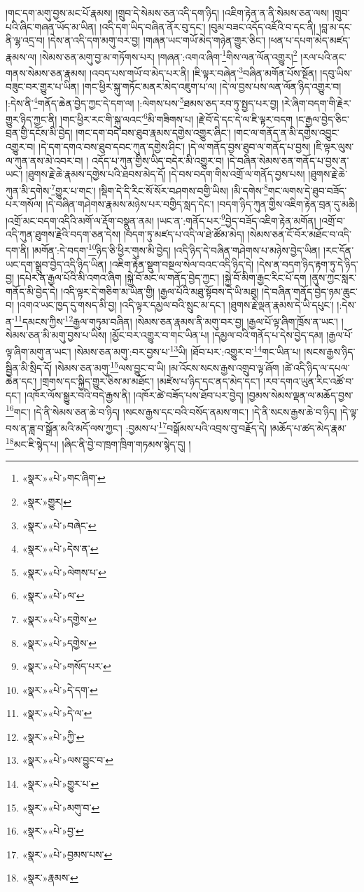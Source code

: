 །གང་དག་མགུ་བྱས་མང་པོ་རྣམས། །གྲུབ་དེ་སེམས་ཅན་འདི་དག་ཉིད། །འཇིག་རྟེན་ན་ནི་སེམས་ཅན་ལས། །གྲུབ་པའི་ཞིང་གཞན་ཡོད་མ་ཡིན། །འདི་དག་ཡིད་བཞིན་ནོར་བུ་དང་། །བུམ་བཟང་འདོད་འཇོའི་བ་དང་ནི། །བླ་མ་དང་ནི་ལྷ་འདྲ་བ། །དེས་ན་འདི་དག་མགུ་བར་བྱ། །གཞན་ཡང་གཡོ་མེད་གཉེན་གྱུར་ཅིང་། །ཕན་པ་དཔག་མེད་མཛད་རྣམས་ལ། །སེམས་ཅན་མགུ་བྱ་མ་གཏོགས་པར། །གཞན་:འགའ་ཞིག་\footnote{«སྣར་»«པེ་»གང་ཞིག་}གིས་ལན་ལོན་འགྱུར།\footnote{«སྣར་»གྱུར།} །རལ་པའི་ནང་གནས་སེམས་ཅན་རྣམས། །འབད་པས་གཡོ་བ་མེད་པར་ནི། །ཇི་ལྟར་བཞེན་\footnote{«སྣར་»«པེ་»བཞེང་}བཞིན་མགོན་པོས་སྔོན། །དབུ་ཡིས་བཟུང་བར་གྱུར་པ་ཡིན། །གང་ཕྱིར་སྐུ་གཏོང་མནར་མེད་འཇུག་པ་ལ། །དེ་ལ་བྱས་པས་ལན་ལོན་ཉིད་འགྱུར་བ། །:དེས་ནི་\footnote{«སྣར་»«པེ་»དེས་ན་}གནོད་ཆེན་བྱེད་ཀྱང་དེ་དག་ལ། །:ལེགས་པས་\footnote{«སྣར་»«པེ་»ལེགས་པ་}ཐམས་ཅད་རབ་ཏུ་སྤྱད་པར་བྱ། །རེ་ཞིག་བདག་གི་རྗེར་གྱུར་ཉིད་ཀྱང་ནི། །གང་ཕྱིར་རང་གི་སྐུ་ལའང་\footnote{«སྣར་»«པེ་»ལ་}མི་གཟིགས་པ། །རྗེ་བོ་དེ་དང་དེ་ལ་ཇི་ལྟར་བདག །ང་རྒྱལ་བྱེད་ཅིང་བྲན་གྱི་དངོས་མི་བྱེད། །གང་དག་བདེ་བས་ཐུབ་རྣམས་དགྱེས་འགྱུར་ཞིང་། །གང་ལ་གནོད་ན་མི་དགྱེས་འབྱུང་འགྱུར་བ། །དེ་དག་དགའ་བས་ཐུབ་དབང་ཀུན་དགྱེས་ཤིང་། །དེ་ལ་གནོད་བྱས་ཐུབ་ལ་གནོད་པ་བྱས། །ཇི་ལྟར་ལུས་ལ་ཀུན་ནས་མེ་འབར་བ། །
འདོད་པ་ཀུན་གྱིས་ཡིད་བདེར་མི་འགྱུར་བ། །དེ་བཞིན་སེམས་ཅན་གནོད་པ་བྱས་ན་ཡང་། །ཐུགས་རྗེ་ཆེ་རྣམས་དགྱེས་པའི་ཐབས་མེད་དོ། །དེ་བས་བདག་གིས་འགྲོ་ལ་གནོད་བྱས་པས། །ཐུགས་རྗེ་ཆེ་ཀུན་མི་དགེས་\footnote{«སྣར་»«པེ་»དགྱེས་}གྱུར་པ་གང་། །སྡིག་དེ་དི་རིང་སོ་སོར་བཤགས་བགྱི་ཡིས། །མི་དགེས་\footnote{«སྣར་»«པེ་»དགྱེས་}གང་ལགས་དེ་ཐུབ་བཟོད་པར་གསོལ། །དེ་བཞིན་གཤེགས་རྣམས་མཉེས་པར་བགྱིད་སླད་དེང་། །བདག་ཉིད་ཀུན་གྱིས་འཇིག་རྟེན་བྲན་དུ་མཆི། །འགྲོ་མང་བདག་འདིའི་མགོ་ལ་རྡོག་བསྣུན་ནམ། །ཡང་ན་:གནོད་པར་\footnote{«སྣར་»«པེ་»གསོད་པར་}བྱེད་བཟོད་འཇིག་རྟེན་མགོན། །འགྲོ་བ་འདི་ཀུན་ཐུགས་རྗེའི་བདག་ཅན་དེས། །བདག་ཏུ་མཛད་པ་འདི་ལ་ཐེ་ཚོམ་མེད། །སེམས་ཅན་ངོ་བོར་མཐོང་བ་འདི་དག་ནི། །མགོན་:དེ་བདག་\footnote{«སྣར་»«པེ་»དེ་དག་}ཉིད་ཅི་ཕྱིར་གུས་མི་བྱེད། །འདི་ཉིད་དེ་བཞིན་གཤེགས་པ་མཉེས་བྱེད་ཡིན། །རང་དོན་ཡང་དག་སྒྲུབ་བྱེད་འདི་ཉིད་ཡིན། །འཇིག་རྟེན་སྡུག་བསྔལ་སེལ་བའང་འདི་ཉིད་དེ། །དེས་ན་བདག་ཉིད་རྟག་ཏུ་དེ་ཉིད་བྱ། །དཔེར་ན་རྒྱལ་པོའི་མི་འགའ་ཞིག །སྐྱེ་བོ་མང་ལ་གནོད་བྱེད་ཀྱང་། །སྐྱེ་བོ་མིག་རྒྱང་རིང་པོ་དག །ནུས་ཀྱང་སླར་གནོད་མི་བྱེད་དེ། །འདི་ལྟར་དེ་གཅིག་མ་ཡིན་གྱི། །རྒྱལ་པོའི་མཐུ་སྟོབས་དེ་ཡི་མཐུ། །དེ་བཞིན་གནོད་བྱེད་ཉམ་ཆུང་བ། །འགའ་ཡང་ཁྱད་དུ་གསད་མི་བྱ། །འདི་ལྟར་དམྱལ་བའི་སྲུང་མ་དང་། །ཐུགས་རྗེ་ལྡན་རྣམས་དེ་ཡི་དཔུང་། །:དེས་ན་\footnote{«སྣར་»«པེ་»དེ་ལ་}དམངས་ཀྱིས་\footnote{«སྣར་»«པེ་»ཀྱི་}རྒྱལ་གཏུམ་བཞིན། །སེམས་ཅན་རྣམས་ནི་མགུ་བར་བྱ། །རྒྱལ་པོ་ལྟ་ཞིག་ཁྲོས་ན་ཡང་། །སེམས་ཅན་མི་མགུ་བྱས་པ་ཡིས། །མྱོང་བར་འགྱུར་བ་གང་ཡིན་པ། །དམྱལ་བའི་གནོད་པ་དེས་བྱེད་དམ། །རྒྱལ་པོ་ལྟ་ཞིག་མགུ་ན་ཡང་། །སེམས་ཅན་མགུ་:བར་བྱས་པ་\footnote{«སྣར་»«པེ་»ལས་བྱུང་བ་}ཡི། །ཐོབ་པར་:འགྱུར་བ་\footnote{«སྣར་»«པེ་»གྱུར་པ་}གང་ཡིན་པ། །སངས་རྒྱས་ཉིད་སྦྱིན་མི་སྲིད་དོ། །སེམས་ཅན་མགུ་\footnote{«སྣར་»«པེ་»མགུ་བ་}ལས་བྱུང་བ་ཡི། །མ་འོངས་སངས་རྒྱས་འགྲུབ་ལྟ་ཞོག །ཚེ་འདི་ཉིད་ལ་དཔལ་ཆེན་དང་། །གྲགས་དང་སྐྱིད་གྱུར་ཅིས་མ་མཐོང་། །མཛེས་པ་ཉིད་དང་ནད་མེད་དང་། །རབ་དགའ་ཡུན་རིང་འཚོ་བ་དང་། །འཁོར་ལོས་སྒྱུར་བའི་བདེ་རྒྱས་ནི། །འཁོར་ཚེ་བཟོད་པས་ཐོབ་པར་བྱེད། །བྱམས་སེམས་ལྡན་ལ་མཆོད་བྱས་\footnote{«སྣར་»«པེ་»བྱ་}གང་། །དེ་ནི་སེམས་ཅན་ཆེ་བ་ཉིད། །སངས་རྒྱས་དང་བའི་བསོད་ནམས་གང་། །དེ་ནི་སངས་རྒྱས་ཆེ་བ་ཉིད། །དེ་ལྟ་བས་ན་ཟླ་བ་སྒྲོན་མའི་མདོ་ལས་ཀྱང་། :བྱམས་པ་\footnote{«སྣར་»«པེ་»བྱམས་པས་}བསྒོམས་པའི་འབྲས་བུ་བརྗོད་དེ། །མཆོད་པ་ཚད་མེད་རྣམ་\footnote{«སྣར་»རྣམས་}མང་ཇི་སྙེད་པ། །ཞིང་ནི་བྱེ་བ་ཁྲག་ཁྲིག་གཏམས་སྙེད་དུ། །
